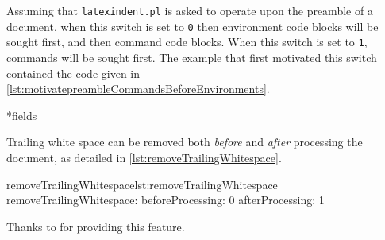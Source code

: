 \documentclass[8pt]{article}
\begin{document}
Assuming that \texttt{latexindent.pl} is asked to operate upon the preamble of a document,
when this switch is set to \texttt{0} then environment code blocks will be sought first, 
and then command code blocks. When this switch is set to \texttt{1}, commands 
will be sought first. The example that first motivated this switch contained the code given in \cref{lst:motivatepreambleCommandsBeforeEnvironments}.
*{fields}

Trailing white space can be removed both \emph{before} and \emph{after} processing 
the document, as detailed in \cref{lst:removeTrailingWhitespace}. 
\begin{yaml}[firstnumber=71]{removeTrailingWhitespace}{lst:removeTrailingWhitespace}
removeTrailingWhitespace:
    beforeProcessing: 0
    afterProcessing: 1
\end{yaml}
Thanks to \cite{vosskuhle} for providing this feature.
\end{document}
